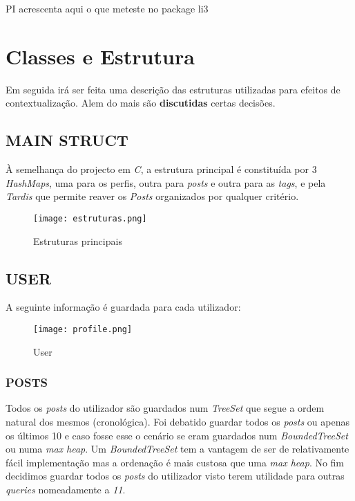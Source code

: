 \documentclass[letterpaper, 10 pt, conference]{IEEEtran} %
\begin{document}
PI acrescenta aqui o que meteste no package li3

\section{Classes e Estrutura}

Em seguida irá ser feita uma descrição das estruturas utilizadas para efeitos de contextualização. Alem do mais são \textbf{discutidas} certas decisões.

\subsection{MAIN STRUCT}
À semelhança do projecto em \textit{C}, a estrutura principal é constituída por 3 \textit{HashMaps}, uma para os perfis, outra para \textit{posts} e outra para as \textit{tags}, e pela \textit{Tardis} que permite reaver os \textit{Posts} organizados por qualquer critério.
\newline

\begin{figure}[h!]
  \centering
  \texttt{[image: estruturas.png]}
   \caption{Estruturas principais}
\end{figure}

\subsection{USER}
A seguinte informação é guardada para cada utilizador:
\newline

\begin{figure}[h!]
  \centering
  \texttt{[image: profile.png]}
   \caption{User}
\end{figure}



\subsubsection{POSTS}


Todos os \textit{posts} do utilizador são guardados num \textit{TreeSet} que segue a ordem natural dos mesmos (cronológica).
Foi debatido guardar todos os \textit{posts} ou apenas os últimos 10 e caso fosse esse o cenário se eram guardados num \textit{BoundedTreeSet} ou numa \textit{max heap}.
Um \textit{BoundedTreeSet} tem a vantagem de ser de relativamente fácil implementação mas a ordenação é mais custosa que uma \textit{max heap}.
No fim decidimos guardar todos os \textit{posts} do utilizador visto terem utilidade para outras \textit{queries} nomeadamente a \textit{11}.
\end{document}
